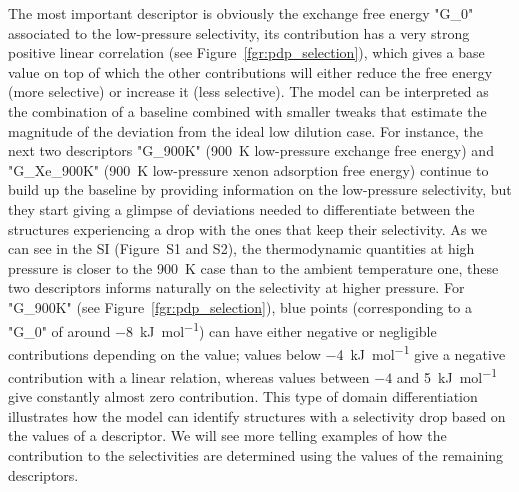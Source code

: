 \documentclass[main]{subfiles}
\begin{document}
The most important descriptor is obviously the exchange free energy "G\_0" associated to the low-pressure selectivity, its contribution has a very strong positive linear correlation (see Figure~\ref{fgr:pdp_selection}), which gives a base value on top of which the other contributions will either reduce the free energy (more selective) or increase it (less selective). The model can be interpreted as the combination of a baseline combined with smaller tweaks that estimate the magnitude of the deviation from the ideal low dilution case. For instance, the next two descriptors "G\_900K" (\SI{900}{\kelvin} low-pressure exchange free energy) and "G\_Xe\_900K" (\SI{900}{\kelvin} low-pressure xenon adsorption free energy) continue to build up the baseline by providing information on the low-pressure selectivity, but they start giving a glimpse of deviations needed to differentiate between the structures experiencing a drop with the ones that keep their selectivity. As we can see in the SI (Figure~S1 and S2), the thermodynamic quantities at high pressure is closer to the \SI{900}{\kelvin} case than to the ambient temperature one, these two descriptors informs naturally on the selectivity at higher pressure. For "G\_900K" (see Figure~\ref{fgr:pdp_selection}), blue points (corresponding to a "G\_0" of around \SI{-8}{\kilo\joule\per\mole}) can have either negative or negligible contributions depending on the value; values below \SI{-4}{\kilo\joule\per\mole} give a negative contribution with a linear relation, whereas values between $-4$ and \SI{5}{\kilo\joule\per\mole} give constantly almost zero contribution. This type of domain differentiation illustrates how the model can identify structures with a selectivity drop based on the values of a descriptor. We will see more telling examples of how the contribution to the selectivities are determined using the values of the remaining descriptors.
\end{document}
